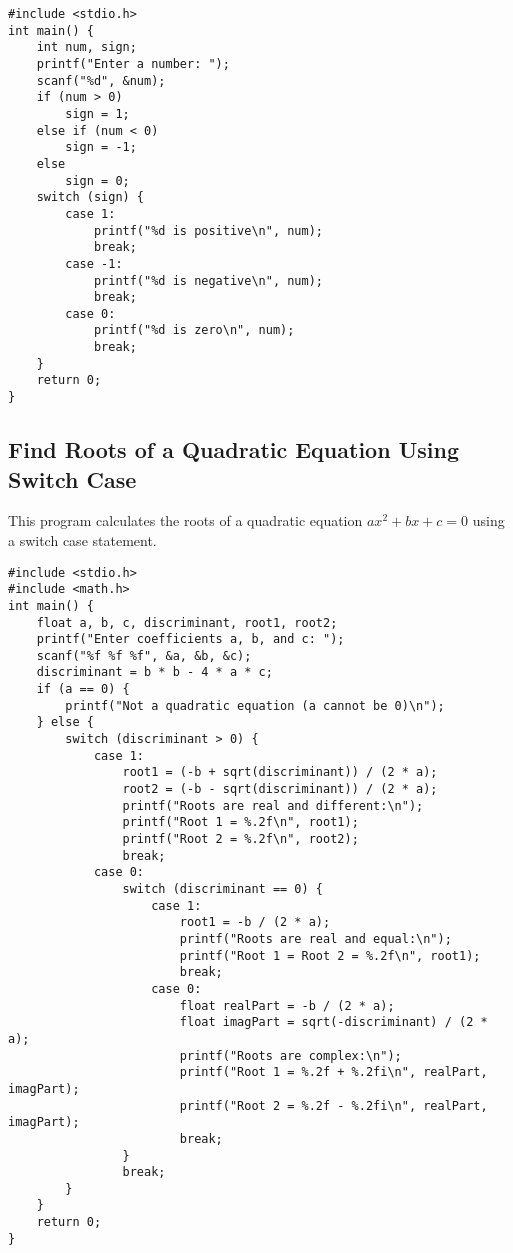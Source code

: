 \documentclass[a4paper,12pt]{article}
\begin{document}
\begin{lstlisting}[caption={Check Whether a Number is Positive, Negative, or Zero Using Switch Case}]
#include <stdio.h>
int main() {
    int num, sign;
    printf("Enter a number: ");
    scanf("%d", &num);
    if (num > 0)
        sign = 1;
    else if (num < 0)
        sign = -1;
    else
        sign = 0;
    switch (sign) {
        case 1:
            printf("%d is positive\n", num);
            break;
        case -1:
            printf("%d is negative\n", num);
            break;
        case 0:
            printf("%d is zero\n", num);
            break;
    }
    return 0;
}
\end{lstlisting}

\newpage

\subsection{Find Roots of a Quadratic Equation Using Switch Case}
This program calculates the roots of a quadratic equation \(ax^2 + bx + c = 0\) using a switch case statement.

\begin{lstlisting}[caption={Find Roots of a Quadratic Equation Using Switch Case}]
#include <stdio.h>
#include <math.h>
int main() {
    float a, b, c, discriminant, root1, root2;
    printf("Enter coefficients a, b, and c: ");
    scanf("%f %f %f", &a, &b, &c);
    discriminant = b * b - 4 * a * c;
    if (a == 0) {
        printf("Not a quadratic equation (a cannot be 0)\n");
    } else {
        switch (discriminant > 0) {
            case 1:
                root1 = (-b + sqrt(discriminant)) / (2 * a);
                root2 = (-b - sqrt(discriminant)) / (2 * a);
                printf("Roots are real and different:\n");
                printf("Root 1 = %.2f\n", root1);
                printf("Root 2 = %.2f\n", root2);
                break;
            case 0:
                switch (discriminant == 0) {
                    case 1:
                        root1 = -b / (2 * a);
                        printf("Roots are real and equal:\n");
                        printf("Root 1 = Root 2 = %.2f\n", root1);
                        break;
                    case 0:
                        float realPart = -b / (2 * a);
                        float imagPart = sqrt(-discriminant) / (2 * a);
                        printf("Roots are complex:\n");
                        printf("Root 1 = %.2f + %.2fi\n", realPart, imagPart);
                        printf("Root 2 = %.2f - %.2fi\n", realPart, imagPart);
                        break;
                }
                break;
        }
    }
    return 0;
}
\end{lstlisting}
\end{document}
